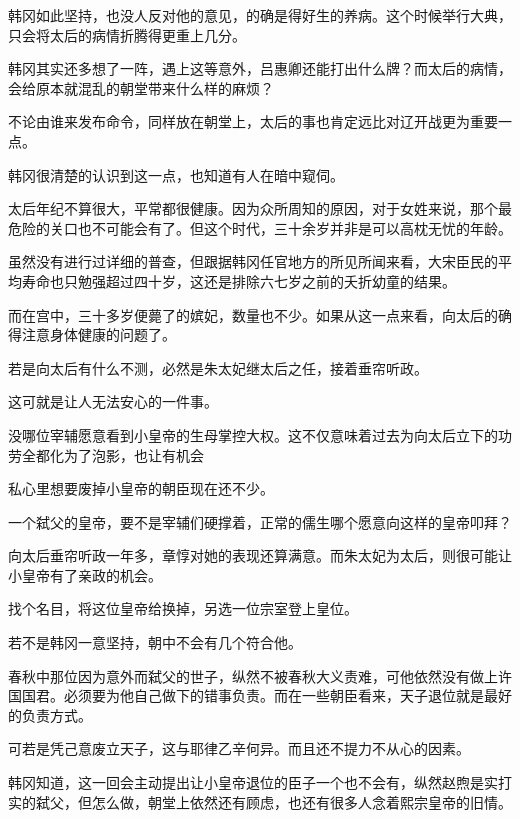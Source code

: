 韩冈如此坚持，也没人反对他的意见，的确是得好生的养病。这个时候举行大典，只会将太后的病情折腾得更重上几分。

韩冈其实还多想了一阵，遇上这等意外，吕惠卿还能打出什么牌？而太后的病情，会给原本就混乱的朝堂带来什么样的麻烦？

不论由谁来发布命令，同样放在朝堂上，太后的事也肯定远比对辽开战更为重要一点。

韩冈很清楚的认识到这一点，也知道有人在暗中窥伺。

太后年纪不算很大，平常都很健康。因为众所周知的原因，对于女姓来说，那个最危险的关口也不可能会有了。但这个时代，三十余岁并非是可以高枕无忧的年龄。

虽然没有进行过详细的普查，但跟据韩冈任官地方的所见所闻来看，大宋臣民的平均寿命也只勉强超过四十岁，这还是排除六七岁之前的夭折幼童的结果。

而在宫中，三十多岁便薨了的嫔妃，数量也不少。如果从这一点来看，向太后的确得注意身体健康的问题了。

若是向太后有什么不测，必然是朱太妃继太后之任，接着垂帘听政。

这可就是让人无法安心的一件事。

没哪位宰辅愿意看到小皇帝的生母掌控大权。这不仅意味着过去为向太后立下的功劳全都化为了泡影，也让有机会

私心里想要废掉小皇帝的朝臣现在还不少。

一个弑父的皇帝，要不是宰辅们硬撑着，正常的儒生哪个愿意向这样的皇帝叩拜？

向太后垂帘听政一年多，章惇对她的表现还算满意。而朱太妃为太后，则很可能让小皇帝有了亲政的机会。

找个名目，将这位皇帝给换掉，另选一位宗室登上皇位。

若不是韩冈一意坚持，朝中不会有几个符合他。

春秋中那位因为意外而弑父的世子，纵然不被春秋大义责难，可他依然没有做上许国国君。必须要为他自己做下的错事负责。而在一些朝臣看来，天子退位就是最好的负责方式。

可若是凭己意废立天子，这与耶律乙辛何异。而且还不提力不从心的因素。

韩冈知道，这一回会主动提出让小皇帝退位的臣子一个也不会有，纵然赵煦是实打实的弑父，但怎么做，朝堂上依然还有顾虑，也还有很多人念着熙宗皇帝的旧情。
